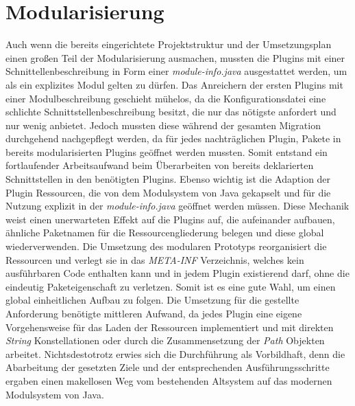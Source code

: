 \section{Modularisierung}
Auch wenn die bereits eingerichtete Projektstruktur und der Umsetzungsplan einen großen Teil der Modularisierung ausmachen, mussten die Plugins mit einer Schnittellenbeschreibung in Form einer \textit{module-info.java} ausgestattet werden, um als ein explizites Modul gelten zu dürfen. Das Anreichern der ersten Plugins mit einer Modulbeschreibung geschieht mühelos, da die Konfigurationsdatei eine schlichte Schnittstellenbeschreibung besitzt, die nur das nötigste anfordert und nur wenig anbietet. Jedoch mussten diese während der gesamten Migration durchgehend nachgepflegt werden, da für jedes nachträglichen Plugin, Pakete in bereits modularisierten Plugins geöffnet werden mussten. Somit entstand ein fortlaufender Arbeitsaufwand beim Überarbeiten von bereits deklarierten Schnittstellen in den benötigten Plugins.\newline
Ebenso wichtig ist die Adaption der Plugin Ressourcen, die von dem Modulsystem von Java gekapselt und für die Nutzung explizit in der \textit{module-info.java} geöffnet werden müssen. Diese Mechanik weist einen unerwarteten Effekt auf die Plugins auf, die aufeinander aufbauen, ähnliche Paketnamen für die Ressourcengliederung belegen und diese global wiederverwenden.\newline
Die Umsetzung des modularen Prototyps reorganisiert die Ressourcen und verlegt sie in das \textit{META-INF} Verzeichnis, welches kein ausführbaren Code enthalten kann und in jedem Plugin existierend darf, ohne die eindeutig Paketeigenschaft zu verletzen. Somit ist es eine gute Wahl, um einen global einheitlichen Aufbau zu folgen. Die Umsetzung für die gestellte Anforderung benötigte mittleren Aufwand, da jedes Plugin eine eigene Vorgehensweise für das Laden der Ressourcen implementiert und mit direkten \textit{String} Konstellationen oder durch die Zusammensetzung der \textit{Path} Objekten arbeitet. \newline
Nichtsdestotrotz erwies sich die Durchführung als Vorbildhaft, denn die Abarbeitung der gesetzten Ziele und der entsprechenden Ausführungsschritte ergaben einen makellosen Weg vom bestehenden Altsystem auf das modernen Modulsystem von Java.\bigbreak

